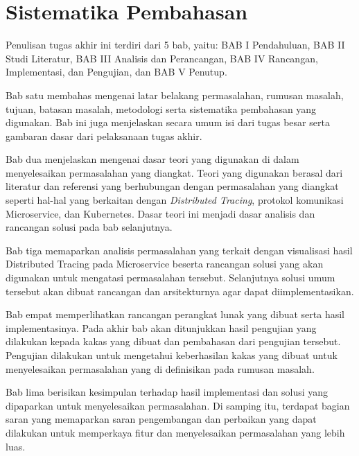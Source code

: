 \section{Sistematika Pembahasan}

Penulisan tugas akhir ini terdiri dari 5 bab, yaitu: BAB I Pendahuluan, BAB II Studi Literatur, BAB III Analisis dan Perancangan, BAB IV Rancangan, Implementasi, dan Pengujian, dan BAB V Penutup.

Bab satu membahas mengenai latar belakang permasalahan, rumusan masalah, tujuan, batasan masalah, metodologi serta sistematika pembahasan yang digunakan. Bab ini juga menjelaskan secara umum isi dari tugas besar serta gambaran dasar dari pelaksanaan tugas akhir.

Bab dua menjelaskan mengenai dasar teori yang digunakan di dalam menyelesaikan permasalahan yang diangkat. Teori yang digunakan berasal dari literatur dan referensi yang berhubungan dengan permasalahan yang diangkat seperti hal-hal yang berkaitan dengan \textit{Distributed Tracing}, protokol komunikasi Microservice, dan Kubernetes. Dasar teori ini menjadi dasar analisis dan rancangan solusi pada bab selanjutnya.

Bab tiga memaparkan analisis permasalahan yang terkait dengan visualisasi hasil Distributed Tracing pada Microservice beserta rancangan solusi yang akan digunakan untuk mengatasi permasalahan tersebut. Selanjutnya solusi umum tersebut akan dibuat rancangan dan arsitekturnya agar dapat diimplementasikan.

Bab empat memperlihatkan rancangan perangkat lunak yang dibuat serta hasil implementasinya. Pada akhir bab akan ditunjukkan hasil pengujian yang dilakukan kepada kakas yang dibuat dan pembahasan dari pengujian tersebut. Pengujian dilakukan untuk mengetahui keberhasilan kakas yang dibuat untuk menyelesaikan permasalahan yang di definisikan pada rumusan masalah.

Bab lima berisikan kesimpulan terhadap hasil implementasi dan solusi yang dipaparkan untuk menyelesaikan permasalahan. Di samping itu, terdapat bagian saran yang memaparkan saran pengembangan dan perbaikan yang dapat dilakukan untuk memperkaya fitur dan menyelesaikan permasalahan yang lebih luas.

